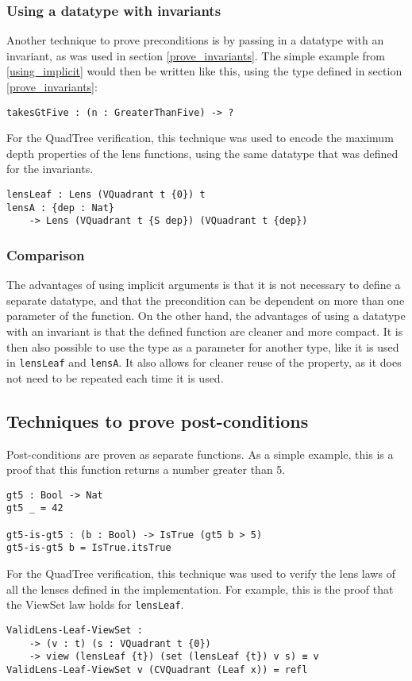 \subsubsection{Using a datatype with invariants}
Another technique to prove preconditions is by passing in a datatype with an invariant, as was used in section \ref{prove_invariants}. The simple example from \ref{using_implicit} would then be written like this, using the type defined in section \ref{prove_invariants}:
\begin{verbatim}
takesGtFive : (n : GreaterThanFive) -> ?
\end{verbatim}

For the QuadTree verification, this technique was used to encode the maximum depth properties of the lens functions, using the same datatype that was defined for the invariants.
\begin{verbatim}
lensLeaf : Lens (VQuadrant t {0}) t
lensA : {dep : Nat} 
    -> Lens (VQuadrant t {S dep}) (VQuadrant t {dep})
\end{verbatim}

\subsubsection{Comparison}
The advantages of using implicit arguments is that it is not necessary to define a separate datatype, and that the precondition can be dependent on more than one parameter of the function. On the other hand, the advantages of using a datatype with an invariant is that the defined function are cleaner and more compact. It is then also possible to use the type as a parameter for another type, like it is used in \verb|lensLeaf| and \verb|lensA|. It also allows for cleaner reuse of the property, as it does not need to be repeated each time it is used.

\subsection{Techniques to prove post-conditions}
Post-conditions are proven as separate functions. As a simple example, this is a proof that this function returns a number greater than 5.
\begin{verbatim}
gt5 : Bool -> Nat
gt5 _ = 42

gt5-is-gt5 : (b : Bool) -> IsTrue (gt5 b > 5)
gt5-is-gt5 b = IsTrue.itsTrue
\end{verbatim}

For the QuadTree verification, this technique was used to verify the lens laws of all the lenses defined in the implementation. For example, this is the proof that the ViewSet law holds for \verb|lensLeaf|.
\begin{verbatim}
ValidLens-Leaf-ViewSet : 
    -> (v : t) (s : VQuadrant t {0}) 
    -> view (lensLeaf {t}) (set (lensLeaf {t}) v s) ≡ v
ValidLens-Leaf-ViewSet v (CVQuadrant (Leaf x)) = refl
\end{verbatim}

